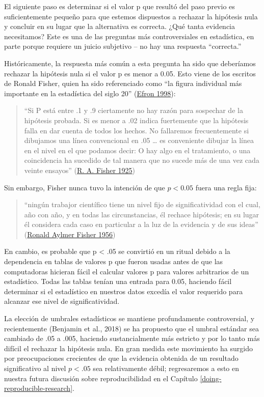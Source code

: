 \documentclass[
  12pt,
]{book}
\begin{document}
El siguiente paso es determinar si el valor p que resultó del paso previo es suficientemente pequeño para que estemos dispuestos a rechazar la hipótesis nula y concluir en su lugar que la alternativa es correcta. ¿Qué tanta evidencia necesitamos? Este es una de las preguntas más controversiales en estadística, en parte porque requiere un juicio subjetivo -- no hay una respuesta ``correcta.''

Históricamente, la respuesta más común a esta pregunta ha sido que deberíamos rechazar la hipótesis nula si el valor p es menor a 0.05. Esto viene de los escritos de Ronald Fisher, quien ha sido referenciado como ``la figura individual más importante en la estadística del siglo 20'' (\protect\hyperlink{ref-efron1998}{Efron 1998}):

\begin{quote}
``Si P está entre .1 y .9 ciertamente no hay razón para sospechar de la hipótesis probada. Si es menor a .02 indica fuertemente que la hipótesis falla en dar cuenta de todos los hechos. No fallaremos frecuentemente si dibujamos una línea convencional en .05 \ldots{} es conveniente dibujar la línea en el nivel en el que podamos decir: O hay algo en el tratamiento, o una coincidencia ha sucedido de tal manera que no sucede más de una vez cada veinte ensayos'' (\protect\hyperlink{ref-fisher1925statistical}{R. A. Fisher 1925})
\end{quote}

Sin embargo, Fisher nunca tuvo la intención de que \(p < 0.05\) fuera una regla fija:

\begin{quote}
``ningún trabajor científico tiene un nivel fijo de significatividad con el cual, año con año, y en todas las circunstancias, él rechace hipótesis; en su lugar él considera cada caso en particular a la luz de la evidencia y de sus ideas'' (\protect\hyperlink{ref-fish:1956}{Ronald Aylmer Fisher 1956})
\end{quote}

En cambio, es probable que p \textless{} .05 se convirtió en un ritual debido a la dependencia en tablas de valores p que fueron usadas antes de que las computadoras hicieran fácil el calcular valores p para valores arbitrarios de un estadístico. Todas las tablas tenían una entrada para 0.05, haciendo fácil determinar si el estadístico en nuestros datos excedía el valor requerido para alcanzar ese nivel de significatividad.

La elección de umbrales estadísticos se mantiene profundamente controversial, y recientemente (Benjamin et al., 2018) se ha propuesto que el umbral estándar sea cambiado de .05 a .005, haciendo sustancialmente más estricto y por lo tanto más difícil el rechazar la hipótesis nula. En gran medida este movimiento ha surgido por preocupaciones crecientes de que la evidencia obtenida de un resultado significativo al nivel \(p < .05\) sea relativamente débil; regresaremos a esto en nuestra futura discusión sobre reproducibilidad en el Capítulo \ref{doing-reproducible-research}.
\end{document}
